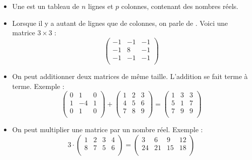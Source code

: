 \documentclass[11pt,class=report,crop=false]{standalone}
\begin{document}
\begin{itemize}
\item Une  est un tableau de $n$ lignes et $p$ colonnes, contenant des nombres réels.
  
  
  
  \item Lorsque il y a autant de lignes que de colonnes, on parle de . Voici une matrice $3\times 3$ :
  $$\begin{pmatrix}
  -1&-1&-1\\
  -1&8&-1\\
  -1&-1&-1\\
  \end{pmatrix}$$
  
  \item {} On peut additionner deux matrices de même taille. L'addition se fait terme à terme. Exemple :
  $$\begin{pmatrix}
  0&1&0\\
  1&-4&1\\
  0&1&0\\
  \end{pmatrix} 
  + 
  \begin{pmatrix}
    1&2&3\\
    4&5&6\\
    7&8&9\\
    \end{pmatrix}
   =
  \begin{pmatrix}
    1&3&3\\
    5&1&7\\
    7&9&9\\
    \end{pmatrix}
  $$  
  \item {} On peut multiplier une matrice par un nombre réel. Exemple :
  $$3 \cdot \begin{pmatrix}
      1&2&3&4\\
      8&7&5&6\\
      \end{pmatrix}
     =
    \begin{pmatrix}
      3&6&9&12\\
      24&21&15&18\\
      \end{pmatrix}     
    $$
 

\end{itemize}
\end{document}
